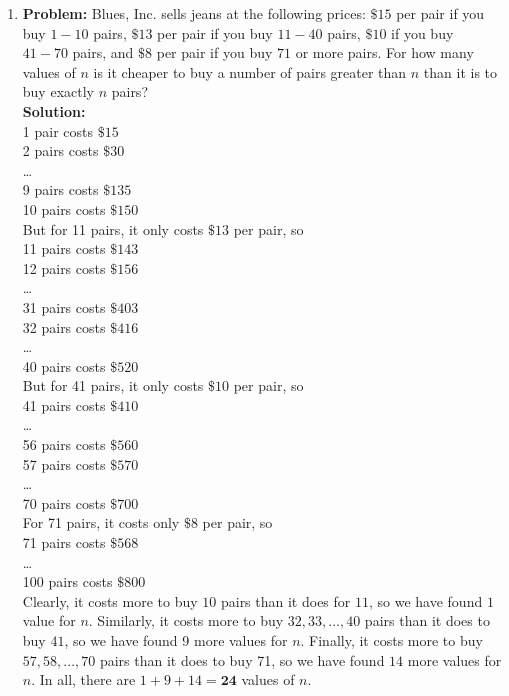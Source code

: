 \documentclass{article}
\begin{document}
\begin{enumerate}
\item \textbf{Problem:} Blues, Inc. sells jeans at the following prices: $\$15$ per pair if you buy
$1-10$ pairs, $\$13$ per pair if you buy $11-40$ pairs, $\$10$ if you buy $41-70$ pairs,
and $\$8$ per pair if you buy $71$ or more pairs.  For how many values of $n$ is it
cheaper to buy a number of pairs greater than $n$ than it is to buy exactly $n$
pairs? \\

\textbf{Solution:} \\
1 pair costs $\$15$ \\
2 pairs costs $\$30$ \\
\ldots \\
9 pairs costs $\$135$ \\
10 pairs costs $\$150$ \\

But for 11 pairs, it only costs $\$13$ per pair, so \\
11 pairs costs $\$143$ \\
12 pairs costs $\$156$ \\
\ldots  \\
31 pairs costs $\$403$ \\
32 pairs costs $\$416$ \\
\ldots  \\
40 pairs costs $\$520$ \\

But for 41 pairs, it only costs $\$10$ per pair, so \\
41 pairs costs $\$410$ \\
\ldots  \\
56 pairs costs $\$560$ \\
57 pairs costs $\$570$ \\
\ldots  \\
70 pairs costs $\$700$ \\

For 71 pairs, it costs only $\$8$ per pair, so \\
71 pairs costs $\$568$ \\
\ldots \\
100 pairs costs $\$800$ \\

Clearly, it costs more to buy $10$ pairs than it does for $11$, so we have found
$1$ value for $n$.  Similarly, it costs more to buy $32, 33, \ldots, 40$ pairs than
it does to buy $41$, so we have found 9 more values for $n$.  Finally, it costs
more to buy $57, 58, \ldots, 70$ pairs than it does to buy 71, so we have found
$14$ more values for $n$.  In all, there are $1 + 9 + 14 = \mathbf{24}$ values of $n$.



\end{enumerate}
\end{document}
